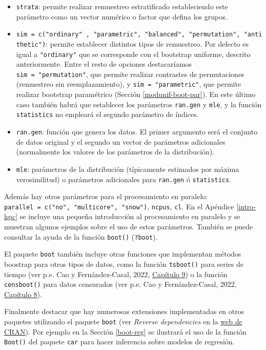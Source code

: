 \documentclass[
]{book}
\theoremstyle{break}
\theoremstyle{nonumberplain}
\begin{document}
\begin{itemize}
\item
  \texttt{strata}: permite realizar remuestreo estratificado estableciendo este parámetro
  como un vector numérico o factor que defina los grupos.
\item
  \texttt{sim\ =\ c("ordinary"\ ,\ "parametric",\ "balanced",\ "permutation",\ "antithetic")}:
  permite establecer distintos tipos de remuestreo.
  Por defecto es igual a \texttt{"ordinary"} que se corresponde con el bootstrap uniforme,
  descrito anteriormente. Entre el resto de opciones destacaríamos
  \texttt{sim\ =\ "permutation"}, que permite realizar contrastes de
  permutaciones (remuestreo sin reemplazamiento), y \texttt{sim\ =\ "parametric"},
  que permite realizar bootstrap paramétrico (Sección \ref{modunif-boot-par}).
  En este último caso también habrá que establecer los parámetros \texttt{ran.gen} y
  \texttt{mle}, y la función \texttt{statistics} no empleará el segundo parámetro de índices.
\item
  \texttt{ran.gen}: función que genera los datos. El primer argumento será el conjunto de datos
  original y el segundo un vector de parámetros adicionales
  (normalmente los valores de los parámetros de la distribución).
\item
  \texttt{mle}: parámetros de la distribución (típicamente estimados por máxima verosimilitud)
  o parámetros adicionales para \texttt{ran.gen} ó \texttt{statistics}.
\end{itemize}

Además hay otros parámetros para el procesamiento en paralelo: \texttt{parallel\ =\ c("no",\ "multicore",\ "snow")}, \texttt{ncpus}, \texttt{cl}.
En el Apéndice \ref{intro-hpc} se incluye una pequeña introducción al procesamiento en paralelo y se muestran algunos ejemplos sobre el uso de estos parámetros.
También se puede consultar la ayuda de la función \texttt{boot()} (\texttt{?boot}).

El paquete \texttt{boot} también incluye otras funciones que implementan métodos boostrap para otros tipos de datos, como la función \texttt{tsboot()} para series de tiempo (ver p.e. Cao y Fernández-Casal, 2022, \href{https://rubenfcasal.github.io/book_remuestreo/bootdep.html}{Capítulo 9}) o la función \texttt{censboot()} para datos censurados (ver p.e. Cao y Fernández-Casal, 2022, \href{https://rubenfcasal.github.io/book_remuestreo/bootcen.html}{Capítulo 8}).

Finalmente destacar que hay numerosas extensiones implementadas en otros paquetes utilizando el paquete \texttt{boot} (ver \emph{Reverse dependencies} en la \href{https://cran.r-project.org/package=boot}{web de CRAN}).
Por ejemplo en la Sección \ref{boot-reg} se ilustrará el uso de la función \texttt{Boot()} del paquete \texttt{car} para hacer inferencia sobre modelos de regresión.
\end{document}
